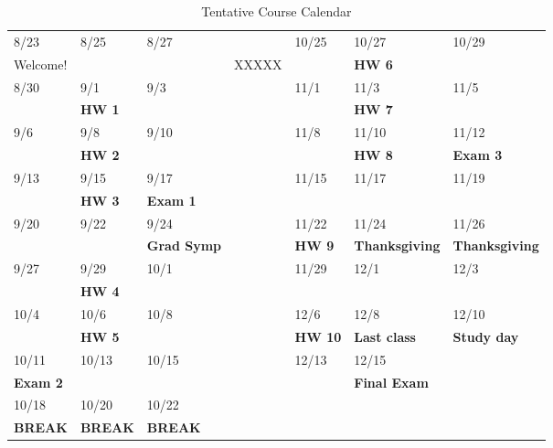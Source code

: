 \documentclass[11pt]{article}
\begin{document}
\begin{table}[htbp]
\caption{Tentative Course Calendar}
\centering
\begin{tabular}{lllllll}
\hline
8/23 & 8/25 & 8/27 &  & 10/25 & 10/27 & 10/29\\
Welcome! &  &  & XXXXX &  & \textbf{HW 6} & \\
\hline
8/30 & 9/1 & 9/3 &  & 11/1 & 11/3 & 11/5\\
 & \textbf{HW 1} &  &  &  & \textbf{HW 7} & \\
\hline
9/6 & 9/8 & 9/10 &  & 11/8 & 11/10 & 11/12\\
 & \textbf{HW 2} &  &  &  & \textbf{HW 8} & \textbf{Exam 3}\\
\hline
9/13 & 9/15 & 9/17 &  & 11/15 & 11/17 & 11/19\\
 & \textbf{HW 3} & \textbf{Exam 1} &  &  &  & \\
\hline
9/20 & 9/22 & 9/24 &  & 11/22 & 11/24 & 11/26\\
 &  & \textbf{Grad Symp} &  & \textbf{HW 9} & \textbf{Thanksgiving} & \textbf{Thanksgiving}\\
\hline
9/27 & 9/29 & 10/1 &  & 11/29 & 12/1 & 12/3\\
 & \textbf{HW 4} &  &  &  &  & \\
\hline
10/4 & 10/6 & 10/8 &  & 12/6 & 12/8 & 12/10\\
 & \textbf{HW 5} &  &  & \textbf{HW 10} & \textbf{Last class} & \textbf{Study day}\\
\hline
10/11 & 10/13 & 10/15 &  & 12/13 & 12/15 & \\
\textbf{Exam 2} &  &  &  &  & \textbf{Final Exam} & \\
\hline
10/18 & 10/20 & 10/22 &  &  &  & \\
\textbf{BREAK} & \textbf{BREAK} & \textbf{BREAK} &  &  &  & \\
\hline
\end{tabular}
\end{table}
\end{document}
